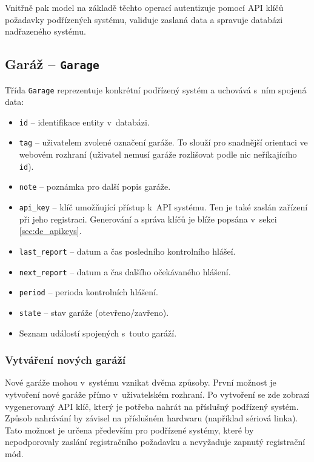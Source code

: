 Vnitřně pak model na základě těchto operací autentizuje pomocí API klíčů požadavky podřízených systému, validuje zaslaná data a spravuje databázi nadřazeného systému.

\subsection{Garáž -- \texttt{Garage}}

Třída \texttt{Garage} reprezentuje konkrétní podřízený systém a uchovává s~ním spojená data:

\begin{itemize}
    \item \texttt{id} -- identifikace entity v~databázi.
    \item \texttt{tag} -- uživatelem zvolené označení garáže. To slouží pro snadnější orientaci ve webovém rozhraní (uživatel nemusí garáže rozlišovat podle nic neříkajícího \texttt{id}).
    \item \texttt{note} -- poznámka pro další popis garáže.
    \item \texttt{api\_key} -- klíč umožňující přístup k~API systému. Ten je také zaslán zařízení při jeho registraci. Generování a správa klíčů je blíže popsána v~sekci \ref{sec:de_apikeys}.
    \item \texttt{last\_report} -- datum a čas posledního kontrolního hlášeí.
    \item \texttt{next\_report} -- datum a čas dalšího očekávaného hlášení.
    \item \texttt{period} -- perioda kontrolních hlášení.
    \item \texttt{state} -- stav garáže (otevřeno/zavřeno).
    \item Seznam událostí spojených s~touto garáží.
\end{itemize}

\subsubsection{Vytváření nových garáží}
\label{sec:de_add_garage}

Nové garáže mohou v~systému vznikat dvěma způsoby. První možnost je vytvoření nové garáže přímo v~uživatelském rozhraní. Po vytvoření se zde zobrazí vygenerovaný API klíč, který je potřeba nahrát na příslušný podřízený systém. Způsob nahrávání by závisel na příslušném hardwaru (například sériová linka). Tato možnost je určena především pro podřízené systémy, které by nepodporovaly zaslání registračního požadavku a nevyžaduje zapnutý registrační mód.

